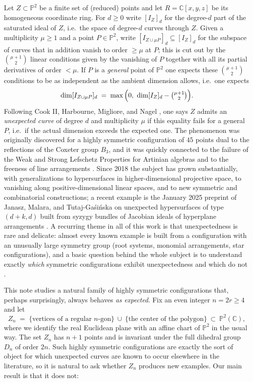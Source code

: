 \documentclass[11pt]{amsart}
\theoremstyle{plain}
\theoremstyle{definition}
\newcommand{\PP}{\mathbb{P}}
\newcommand{\CC}{\mathbb{C}}
\begin{document}
Let $Z\subset \PP^2$ be a finite set of (reduced) points and let $R=\CC[x,y,z]$ be its homogeneous coordinate ring. For $d\ge 0$ write $[I_Z]_d$ for the degree-$d$ part of the saturated ideal of $Z$, i.e.\ the space of degree-$d$ curves through $Z$. Given a multiplicity $\mu\ge1$ and a point $P\in\PP^2$, write $[I_{Z\cup \mu P}]_d\subseteq [I_Z]_d$ for the subspace of curves that in addition vanish to order $\ge\mu$ at $P$; this is cut out by the $\binom{\mu+1}{2}$ linear conditions given by the vanishing of $P$ together with all its partial derivatives of order $<\mu$. If $P$ is a \emph{general} point of $\PP^2$ one expects these $\binom{\mu+1}2$ conditions to be as independent as the ambient dimension allows, i.e.\ one expects
\[
\dim [I_{Z\cup\mu P}]_d \;=\; \max\Big(0,\ \dim[I_Z]_d-\tbinom{\mu+1}{2}\Big).
\]
Following Cook II, Harbourne, Migliore, and Nagel \cite{CHMN}, one says $Z$ admits an \emph{unexpected curve} of degree $d$ and multiplicity $\mu$ if this equality fails for a general $P$, i.e.\ if the actual dimension exceeds the expected one. The phenomenon was originally discovered for a highly symmetric configuration of $45$ points dual to the reflections of the Coxeter group $B_3$, and it was quickly connected to the failure of the Weak and Strong Lefschetz Properties for Artinian algebras and to the freeness of line arrangements \cite{HMNT,Survey}. Since 2018 the subject has grown substantially, with generalizations to hypersurfaces in higher-dimensional projective space, to vanishing along positive-dimensional linear spaces, and to new symmetric and combinatorial constructions; a recent example is the January 2025 preprint of Janasz, Malara, and Tutaj-Ga\'{s}i\'{n}ska on unexpected hypersurfaces of type $(d+k,d)$ built from syzygy bundles of Jacobian ideals of hyperplane arrangements \cite{JMT}. A recurring theme in all of this work is that unexpectedness is rare and delicate: almost every known example is built from a configuration with an unusually large symmetry group (root systems, monomial arrangements, star configurations), and a basic question behind the whole subject is to understand exactly \emph{which} symmetric configurations exhibit unexpectedness and which do not \cite{Survey}.

This note studies a natural family of highly symmetric configurations that, perhaps surprisingly, always behaves \emph{as expected}. Fix an even integer $n=2r\ge4$ and let
\[
Z_n \;=\; \{\text{vertices of a regular } n\text{-gon}\} \ \cup\ \{\text{the center of the polygon}\}\ \subset\ \PP^2(\CC),
\]
where we identify the real Euclidean plane with an affine chart of $\PP^2$ in the usual way. The set $Z_n$ has $n+1$ points and is invariant under the full dihedral group $D_n$ of order $2n$. Such highly symmetric configurations are exactly the sort of object for which unexpected curves are known to occur elsewhere in the literature, so it is natural to ask whether $Z_n$ produces new examples. Our main result is that it does not:
\end{document}
